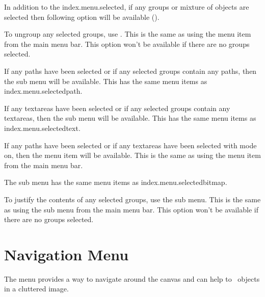 In addition to the \gls{index.menu.selected},
if any \glspl{group} or mixture of \glspl{object} are selected 
then following option will be available
().


To ungroup any selected \glspl{group}, use
. This is the same as using the
 menu item from the main menu bar.
This option won't be available if there are no
\glspl{group} selected.


If any \glspl{path} have been selected or if any selected
\glspl{group} contain any \glspl{path}, then the
 sub menu will be available. This has the same
menu items as \gls{index.menu.selectedpath}.


If any \glspl{textarea} have been selected or if any selected
\glspl{group} contain any \glspl{textarea}, then the
 sub menu will be available. This has the same
menu items as \gls{index.menu.selectedtext}.


If any \glspl{path} have been selected or if any \glspl*{textarea}
have been selected with  mode on, then the
 menu item will be available. This is the
same as using the  menu item from the main
menu bar.


The  sub menu has the same
menu items as \gls{index.menu.selectedbitmap}.


To justify the contents of any selected \glspl{group}, use the
 sub menu. This is the same as using the
 sub menu from the main menu bar.
This option won't be available if there are no
\glspl{group} selected.


\section{Navigation Menu}\label{sec:navigate}


The  menu provides a way to navigate around the
\gls{canvas} and can help to \select\ \glspl{object}
in a cluttered image.

